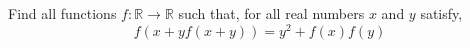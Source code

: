 Find all functions $f:\mathbb{R}\rightarrow\mathbb{R}$ such that, for all real numbers $x$ and $y$ satisfy,
$$f\left(x+yf(x+y)\right)=y^2+f(x)f(y)$$
